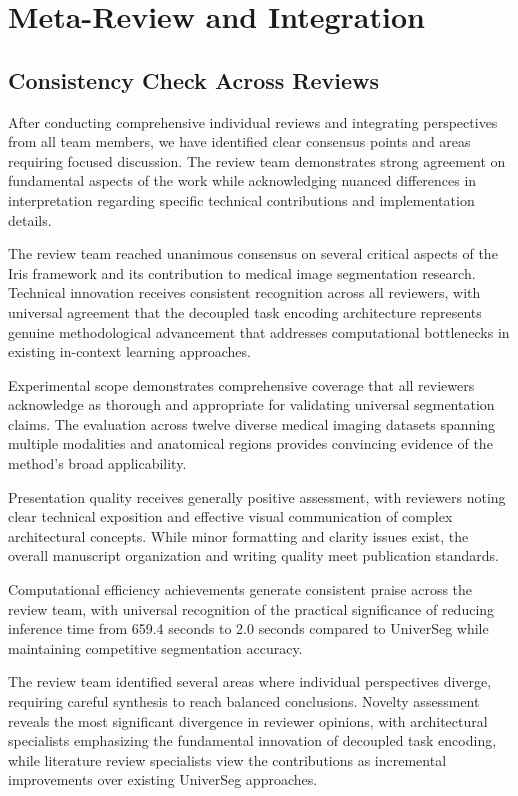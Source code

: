 \section{Meta-Review and Integration}
\label{sec:meta_review}

\subsection{Consistency Check Across Reviews}
After conducting comprehensive individual reviews and integrating perspectives from all team members, we have identified clear consensus points and areas requiring focused discussion. The review team demonstrates strong agreement on fundamental aspects of the work while acknowledging nuanced differences in interpretation regarding specific technical contributions and implementation details.

The review team reached unanimous consensus on several critical aspects of the Iris framework and its contribution to medical image segmentation research. Technical innovation receives consistent recognition across all reviewers, with universal agreement that the decoupled task encoding architecture represents genuine methodological advancement that addresses computational bottlenecks in existing in-context learning approaches.

Experimental scope demonstrates comprehensive coverage that all reviewers acknowledge as thorough and appropriate for validating universal segmentation claims. The evaluation across twelve diverse medical imaging datasets spanning multiple modalities and anatomical regions provides convincing evidence of the method's broad applicability.

Presentation quality receives generally positive assessment, with reviewers noting clear technical exposition and effective visual communication of complex architectural concepts. While minor formatting and clarity issues exist, the overall manuscript organization and writing quality meet publication standards.

Computational efficiency achievements generate consistent praise across the review team, with universal recognition of the practical significance of reducing inference time from 659.4 seconds to 2.0 seconds compared to UniverSeg while maintaining competitive segmentation accuracy.

The review team identified several areas where individual perspectives diverge, requiring careful synthesis to reach balanced conclusions. Novelty assessment reveals the most significant divergence in reviewer opinions, with architectural specialists emphasizing the fundamental innovation of decoupled task encoding, while literature review specialists view the contributions as incremental improvements over existing UniverSeg approaches.

